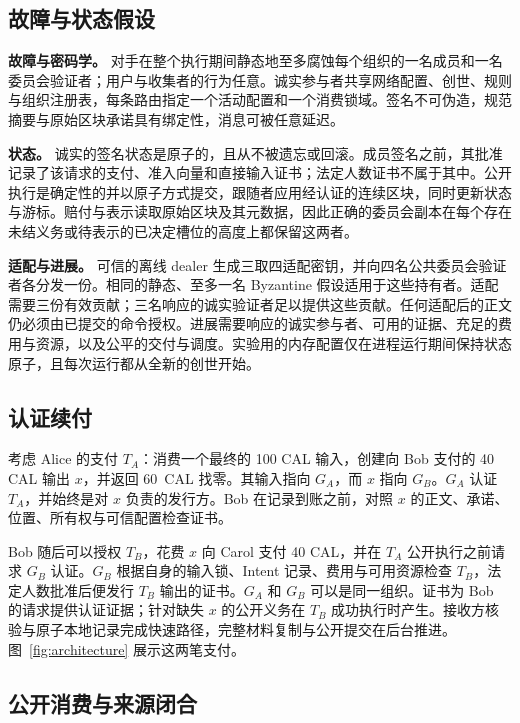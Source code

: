 \subsection{故障与状态假设}
\label{sec:model-assumptions}

\noindent\textbf{故障与密码学。}
对手在整个执行期间静态地至多腐蚀每个组织的一名成员和一名委员会验证者；用户与收集者的行为任意。诚实参与者共享网络配置、创世、规则与组织注册表，每条路由指定一个活动配置和一个消费锁域。签名不可伪造，规范摘要与原始区块承诺具有绑定性，消息可被任意延迟。

\noindent\textbf{状态。}
诚实的签名状态是原子的，且从不被遗忘或回滚。成员签名之前，其批准记录了该请求的支付、准入向量和直接输入证书；法定人数证书不属于其中。公开执行是确定性的并以原子方式提交，跟随者应用经认证的连续区块，同时更新状态与游标。赔付与表示读取原始区块及其元数据，因此正确的委员会副本在每个存在未结义务或待表示的已决定槽位的高度上都保留这两者。

\noindent\textbf{适配与进展。}
可信的离线 dealer 生成三取四适配密钥，并向四名公共委员会验证者各分发一份。相同的静态、至多一名 Byzantine 假设适用于这些持有者。适配需要三份有效贡献；三名响应的诚实验证者足以提供这些贡献。任何适配后的正文仍必须由已提交的命令授权。进展需要响应的诚实参与者、可用的证据、充足的费用与资源，以及公平的交付与调度。实验用的内存配置仅在进程运行期间保持状态原子，且每次运行都从全新的创世开始。

\subsection{认证续付}
\label{sec:model-example}

考虑 Alice 的支付 $T_A$：消费一个最终的 100 CAL 输入，创建向 Bob 支付的 40 CAL 输出 $x$，并返回 60~CAL 找零。其输入指向 $G_A$，而 $x$ 指向 $G_B$。$G_A$ 认证 $T_A$，并始终是对 $x$ 负责的发行方。Bob 在记录到账之前，对照 $x$ 的正文、承诺、位置、所有权与可信配置检查证书。

Bob 随后可以授权 $T_B$，花费 $x$ 向 Carol 支付 40 CAL，并在 $T_A$ 公开执行之前请求 $G_B$ 认证。$G_B$ 根据自身的输入锁、Intent 记录、费用与可用资源检查 $T_B$，法定人数批准后便发行 $T_B$ 输出的证书。$G_A$ 和 $G_B$ 可以是同一组织。证书为 Bob 的请求提供认证证据；针对缺失 $x$ 的公开义务在 $T_B$ 成功执行时产生。接收方核验与原子本地记录完成快速路径，完整材料复制与公开提交在后台推进。图~\ref{fig:architecture} 展示这两笔支付。



\subsection{公开消费与来源闭合}
\label{sec:model-contract}

